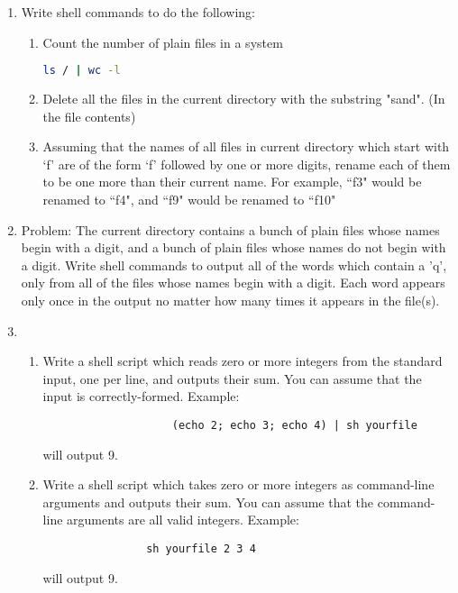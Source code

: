 \documentclass[11pt]{article}
\begin{document}
	\begin{enumerate}
		\item Write shell commands to do the following:
			\begin{enumerate}
				\item Count the number of plain files in a system
					\begin{lstlisting}[language=sh]
ls / | wc -l\end{lstlisting}
				\item Delete all the files in the current directory with the substring "sand". (In the file contents)
					

				\item Assuming that the names of all files in current directory which start with `f' are of the form `f' followed by one or more digits, rename each of them to be one more than their current name. For example, ``f3" would be renamed to ``f4", and ``f9" would be renamed to ``f10"
					
			\end{enumerate}

\newpage
		\item
		Problem: The current directory contains a bunch of plain files whose names begin with a digit,
		and a bunch of plain files whose names do not begin with a digit. Write shell commands to
		output all of the words which contain a 'q', only from all of the files whose names begin with a digit. Each word appears only once in the output no matter how many times it appears in the file(s).
			
\newpage
		\item
			\begin{enumerate}
				\item Write a shell script which reads zero or more integers from the standard input, one per line, and outputs their sum. You can assume that the input is correctly-formed.
				Example:
				\begin{verbatim}
					(echo 2; echo 3; echo 4) | sh yourfile
				\end{verbatim}
			will output 9.
					

				\item Write a shell script which takes zero or more integers as command-line arguments and outputs their sum. You can assume that the command-line arguments are all valid integers.
				Example:
				\begin{verbatim}
				sh yourfile 2 3 4
			\end{verbatim}
		 will output 9.
		 			
			\end{enumerate}
\newpage


\end{enumerate}
\end{document}
